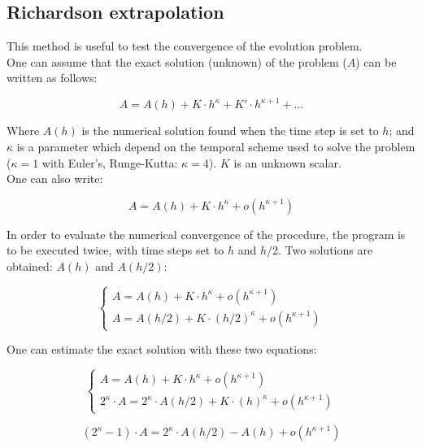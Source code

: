\subsection{Richardson extrapolation}

This method is useful to test the convergence of the evolution problem. \\

One can assume that the exact solution (unknown) of the problem ($A$) can be
written as follows: 

\begin{equation}
A=A(h)+ K\cdot h^{\kappa} + K'\cdot h^{\kappa+1}+\ldots
\end{equation}

Where $A(h)$ is the numerical solution found when the time step is set to $h$;
and $\kappa$ is a parameter which depend on the temporal scheme used to solve
the problem ($\kappa=1$ with Euler's, Runge-Kutta:  $\kappa=4$). $K$ is
an unknown scalar.\\

One can also write: 

\begin{equation}
A=A(h)+ K\cdot h^{\kappa} + o(h^{\kappa+1})
\end{equation}

In order to evaluate the numerical convergence of the procedure, the program is
to be executed twice, with time steps set to $h$ and $h/2$. Two solutions are
obtained: $A(h)$ and $A(h/2)$: 

\begin{equation} \label{Richardson}
\begin{cases}
A=A(h)+ K\cdot h^{\kappa} + o(h^{\kappa+1})\\
A=A(h/2)+ K\cdot (h/2)^{\kappa} + o(h^{\kappa+1})
\end{cases}
\end{equation}

One can estimate the exact solution with these two equations: 

\begin{equation}
\begin{cases}
A=A(h)+ K\cdot h^{\kappa} + o(h^{\kappa+1})\\
2^{\kappa} \cdot A= 2^{\kappa}\cdot A(h/2)+ K\cdot (h)^{\kappa} +
o(h^{\kappa+1})
\end{cases}
\end{equation}

\begin{equation}
(2^{\kappa}-1) \cdot A= 2^{\kappa}\cdot A(h/2)- A(h) +
o(h^{\kappa+1})
\end{equation}

